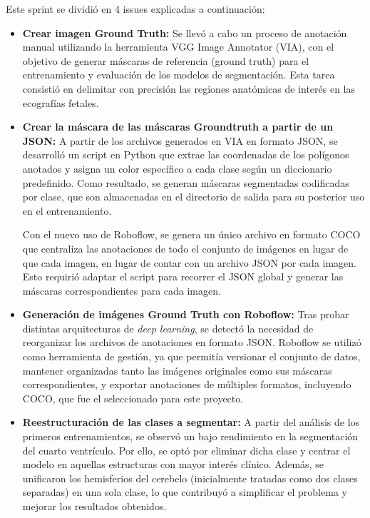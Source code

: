 Este sprint se dividió en 4 issues explicadas a continuación:
\begin{itemize}
    \item \textbf{Crear imagen Ground Truth:} Se llevó a cabo un proceso de anotación manual utilizando la herramienta VGG Image Annotator (VIA), con el objetivo de generar máscaras de referencia (ground truth) para el entrenamiento y evaluación de los modelos de segmentación. Esta tarea consistió en delimitar con precisión las regiones anatómicas de interés en las ecografías fetales. 
    \item \textbf{Crear la máscara de las máscaras Groundtruth a partir de un JSON:} A partir de los archivos generados en VIA en formato JSON, se desarrolló un script en Python que extrae las coordenadas de los polígonos anotados y asigna un color específico a cada clase según un diccionario predefinido. Como resultado, se generan máscaras segmentadas codificadas por clase, que son almacenadas en el directorio de salida para su posterior uso en el entrenamiento.

    Con el nuevo uso de Roboflow, se genera un único archivo en formato COCO que centraliza las anotaciones de todo el conjunto de imágenes en lugar de que cada imagen, en lugar de contar con un archivo JSON por cada imagen. Esto requirió adaptar el script para recorrer el JSON global y generar las máscaras correspondientes para cada imagen.
    \item \textbf{Generación de imágenes Ground Truth con Roboflow:} Tras probar distintas arquitecturas de \textit{deep learning}, se detectó la necesidad de reorganizar los archivos de anotaciones en formato JSON. Roboflow se utilizó como herramienta de gestión, ya que permitía versionar el conjunto de datos, mantener organizadas tanto las imágenes originales como sus máscaras correspondientes, y exportar anotaciones de múltiples formatos, incluyendo COCO, que fue el seleccionado para este proyecto.
    \item \textbf{Reestructuración de las clases a segmentar:} A partir del análisis de los primeros entrenamientos, se observó un bajo rendimiento en la segmentación del cuarto ventrículo. Por ello, se optó por eliminar dicha clase y centrar el modelo en aquellas estructuras con mayor interés clínico. Además, se unificaron los hemisferios del cerebelo (inicialmente tratadas como dos clases separadas) en una sola clase, lo que contribuyó a simplificar el problema y mejorar los resultados obtenidos. 
\end{itemize}

